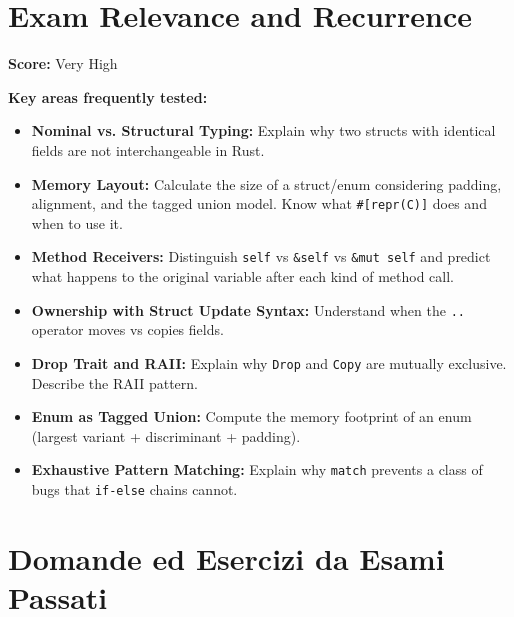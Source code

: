 \section*{Exam Relevance and Recurrence}

\begin{examprioritybox}
\textbf{Score:} Very High

\textbf{Key areas frequently tested:}
\begin{itemize}
    \item \textbf{Nominal vs. Structural Typing:} Explain why two structs with identical fields are not interchangeable in Rust.
    \item \textbf{Memory Layout:} Calculate the size of a struct/enum considering padding, alignment, and the tagged union model. Know what \texttt{\#[repr(C)]} does and when to use it.
    \item \textbf{Method Receivers:} Distinguish \texttt{self} vs \texttt{\&self} vs \texttt{\&mut self} and predict what happens to the original variable after each kind of method call.
    \item \textbf{Ownership with Struct Update Syntax:} Understand when the \texttt{..} operator moves vs copies fields.
    \item \textbf{Drop Trait and RAII:} Explain why \texttt{Drop} and \texttt{Copy} are mutually exclusive. Describe the RAII pattern.
    \item \textbf{Enum as Tagged Union:} Compute the memory footprint of an enum (largest variant + discriminant + padding).
    \item \textbf{Exhaustive Pattern Matching:} Explain why \texttt{match} prevents a class of bugs that \texttt{if-else} chains cannot.
\end{itemize}
\end{examprioritybox}

\section*{Domande ed Esercizi da Esami Passati}


